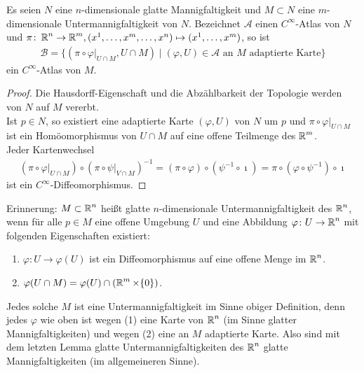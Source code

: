 \begin{lemma}
  Es seien $N$ eine $n$-dimensionale glatte Mannigfaltigkeit und $M \subset N$ eine $m$-dimensionale Untermannigfaltigkeit von $N$. Bezeichnet $\mathcal A$ einen $C^{\infty}$-Atlas von $N$ und $\pi \colon \operatorname{\mathbb{R}}^n \to \operatorname{\mathbb{R}}^m, (x^1, \ldots, x^m,\ldots,x^n) \mapsto (x^1, \ldots, x^m)$, so ist
  \begin{align*}
    \mathcal B = \{(\pi \circ \varphi|_{U \cap M},U\cap M) \mid (\varphi, U) \in \mathcal A \text{ an } M \text{ adaptierte Karte}\}
  \end{align*}
  ein $C^{\infty}$-Atlas von $M$.
\end{lemma}

\begin{proof}
  Die Hausdorff-Eigenschaft und die Abzählbarkeit der Topologie werden von $N$ auf $M$ vererbt.\\
  Ist $p \in N$, so existiert eine adaptierte Karte $(\varphi,U)$ von $N$ um $p$ und $\pi \circ \varphi|_{U \cap M}$ ist ein Homöomorphismus von $U \cap M$ auf eine offene Teilmenge des $\operatorname{\mathbb{R}}^m$.\\
  Jeder Kartenwechsel
  \begin{align*}
    (\pi \circ \varphi|_{U \cap M}) \circ (\pi \circ \psi|_{V \cap M})^{-1} = (\pi \circ \varphi) \circ (\psi^{-1} \circ \imath) = \pi \circ (\varphi \circ \psi^{-1}) \circ \imath
  \end{align*}
  ist ein $C^{\infty}$-Diffeomorphismus.
\end{proof}

\begin{bem}
  Erinnerung: $M \subset \operatorname{\mathbb{R}}^n$ heißt glatte $n$-dimensionale Untermannigfaltigkeit des $\operatorname{\mathbb{R}}^n$, wenn für alle $p \in M$ eine offene Umgebung $U$ und eine Abbildung $\varphi \colon U \to \operatorname{\mathbb{R}}^n$  mit folgenden Eigenschaften existiert:
  \begin{enumerate}
  \item $\varphi \colon U \to \varphi(U)$ ist ein Diffeomorphismus auf eine offene Menge im $\operatorname{\mathbb{R}}^{n}$.
  \item $\varphi(U \cap M) = \varphi(U) \cap (\operatorname{\mathbb{R}}^{m} \times \{0\})$.
  \end{enumerate}
Jedes solche $M$ ist eine Untermannigfaltigkeit im Sinne obiger Definition, denn jedes $\varphi$ wie oben ist wegen (1) eine Karte von $\operatorname{\mathbb{R}}^n$ (im Sinne glatter Mannigfaltigkeiten) und wegen (2) eine an $M$ adaptierte Karte. Also sind mit dem letzten Lemma glatte Untermannigfaltigkeiten des $\operatorname{\mathbb{R}}^n$ glatte Mannigfaltigkeiten (im allgemeineren Sinne).
\end{bem}



